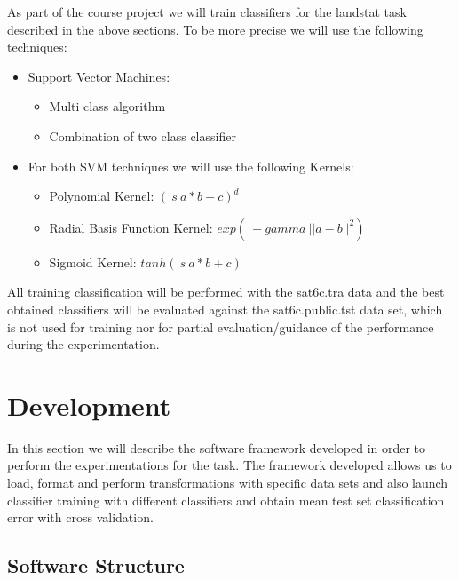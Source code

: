 \documentclass[a4paper,10pt,titlepage]{article}
\begin{document}
\par As part of the course project we will train classifiers for the landstat task described in the above sections. To be more precise we will use the following techniques:
\begin{itemize}
	\item Support Vector Machines:
		\begin{itemize}
			\item Multi class algorithm 
			\item Combination of two class classifier
		\end{itemize}
	\item For both SVM techniques we will use the following Kernels:
	\begin{itemize}
		\item Polynomial Kernel: \begin{math} (\ s\ a*b +c)^d\end{math}
		\item Radial Basis Function Kernel: \begin{math} exp(\ -gamma\ ||a-b||^2) \end{math}
		\item Sigmoid Kernel: \begin{math} tanh(\ s\ a*b + c) \end{math}		
	\end{itemize}
\end{itemize}

\par All training classification will be performed with the sat6c.tra data and the best obtained classifiers will be evaluated against the sat6c.public.tst data set, which is not used for training nor for partial evaluation/guidance of the performance during the experimentation. 

\section{Development}

\par In this section we will describe the software framework developed in order to perform the experimentations for the task. The framework developed allows us to load, format and perform transformations with specific data sets and also launch classifier training with different classifiers and obtain mean test set classification error with cross validation. 

\subsection{Software Structure}
\end{document}
